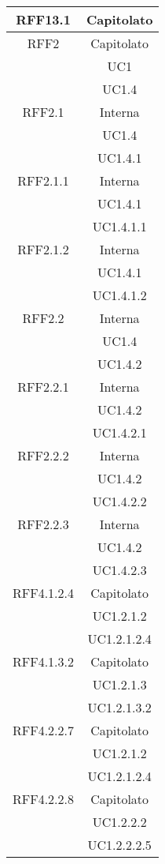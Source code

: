 \begin{longtable}{|c|c|}
\midrule
RFF13.1
& Capitolato\\

\midrule
RFF2
& Capitolato\\
& UC1\\
& UC1.4\\

\midrule
RFF2.1
& Interna\\
& UC1.4\\
& UC1.4.1\\

\midrule
RFF2.1.1
& Interna\\
& UC1.4.1\\
& UC1.4.1.1\\

\midrule
RFF2.1.2
& Interna\\
& UC1.4.1\\
& UC1.4.1.2\\

\midrule
RFF2.2
& Interna\\
& UC1.4\\
& UC1.4.2\\

\midrule
RFF2.2.1
& Interna\\
& UC1.4.2\\
& UC1.4.2.1\\

\midrule
RFF2.2.2
& Interna\\
& UC1.4.2\\
& UC1.4.2.2\\

\midrule
RFF2.2.3
& Interna\\
& UC1.4.2\\
& UC1.4.2.3\\

\midrule
RFF4.1.2.4
& Capitolato\\
& UC1.2.1.2\\
& UC1.2.1.2.4\\

\midrule
RFF4.1.3.2
& Capitolato\\
& UC1.2.1.3\\
& UC1.2.1.3.2\\

\midrule
RFF4.2.2.7
& Capitolato\\
& UC1.2.1.2\\
& UC1.2.1.2.4\\

\midrule
RFF4.2.2.8
& Capitolato\\
& UC1.2.2.2\\
& UC1.2.2.2.5\\


\end{longtable}
